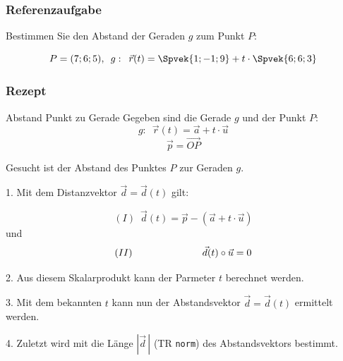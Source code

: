 \newpage
\subsubsection{Referenzaufgabe}

Bestimmen Sie den Abstand der Geraden $g$ zum Punkt $P$:

$$P=(7;6;5),\,\,\, g: \,\,\, \vec{r}(t) = \Spvek{1;-1;9} +
t\cdot{}\Spvek{6;6;3}$$




\subsubsection*{Rezept}

\begin{rezept}{Abstand Punkt zu Gerade}{}
  Gegeben sind die Gerade $g$ und der Punkt $P$:
  $$g: \,\,\, \vec{r}(t) = \vec{a} + t\cdot{} \vec{u}$$
  $$\vec{p} = \overrightarrow{OP}$$



  Gesucht ist der Abstand des Punktes $P$ zur Geraden $g$.

  1. Mit dem Distanzvektor $\vec{d} = \vec{d}(t)$ gilt:

  $$(I) \,\,\, \vec{d}(t) = \vec{p} - (\vec{a} + t\cdot{}\vec{u})$$
  und
  $$(II) \hspace{25mm}  \vec{d}(t) \circ \vec{u} = 0$$

  2. Aus diesem Skalarprodukt kann der Parmeter $t$ berechnet werden.

  3. Mit dem bekannten $t$ kann nun der Abstandsvektor $\vec{d} = \vec{d}(t)$ ermittelt werden.

  4. Zuletzt wird mit die Länge $\left| \vec{d} \,\right|$ (TR \texttt{norm}) des Abstandsvektors bestimmt.
\end{rezept}

